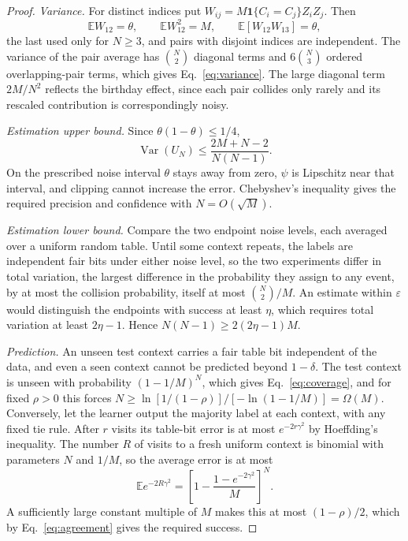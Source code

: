 \documentclass[11pt,a4paper]{article}
\newcommand{\E}{\mathbb{E}}
\newcommand{\I}{\mathbf{1}}
\begin{document}
\begin{proof}
\emph{Variance.} For distinct indices put \(W_{ij}=M\I\{C_i=C_j\}Z_iZ_j\). Then
\[
\E W_{12}=\theta,\qquad
\E W_{12}^2=M,\qquad
\E[W_{12}W_{13}]=\theta,
\]
the last used only for \(N\ge3\), and pairs with disjoint indices are independent. The variance of the pair average has \(\binom N2\) diagonal terms and \(6\binom N3\) ordered overlapping-pair terms, which gives Eq.~\eqref{eq:variance}. The large diagonal term \(2M/N^2\) reflects the birthday effect, since each pair collides only rarely and its rescaled contribution is correspondingly noisy.

\emph{Estimation upper bound.} Since \(\theta(1-\theta)\le1/4\),
\[
\operatorname{Var}(U_N)\le\frac{2M+N-2}{N(N-1)}.
\]
On the prescribed noise interval \(\theta\) stays away from zero, \(\psi\) is Lipschitz near that interval, and clipping cannot increase the error. Chebyshev's inequality gives the required precision and confidence with \(N=O(\sqrt M)\).

\emph{Estimation lower bound.} Compare the two endpoint noise levels, each averaged over a uniform random table. Until some context repeats, the labels are independent fair bits under either noise level, so the two experiments differ in total variation, the largest difference in the probability they assign to any event, by at most the collision probability, itself at most \(\binom N2/M\). An estimate within \(\varepsilon\) would distinguish the endpoints with success at least \(\eta\), which requires total variation at least \(2\eta-1\). Hence \(N(N-1)\ge2(2\eta-1)M\).

\emph{Prediction.} An unseen test context carries a fair table bit independent of the data, and even a seen context cannot be predicted beyond \(1-\delta\). The test context is unseen with probability \((1-1/M)^N\), which gives Eq.~\eqref{eq:coverage}, and for fixed \(\rho>0\) this forces \(N\ge\ln[1/(1-\rho)]/[-\ln(1-1/M)]=\Omega(M)\). Conversely, let the learner output the majority label at each context, with any fixed tie rule. After \(r\) visits its table-bit error is at most \(e^{-2r\gamma^2}\) by Hoeffding's inequality. The number \(R\) of visits to a fresh uniform context is binomial with parameters \(N\) and \(1/M\), so the average error is at most
\[
\E e^{-2R\gamma^2}
=\left[1-\frac{1-e^{-2\gamma^2}}{M}\right]^N.
\]
A sufficiently large constant multiple of \(M\) makes this at most \((1-\rho)/2\), which by Eq.~\eqref{eq:agreement} gives the required success.
\end{proof}
\end{document}
